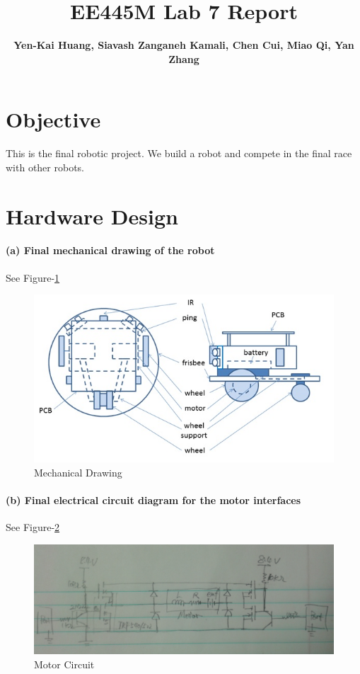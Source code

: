 \documentclass[a4paper]{article}
\newlength{\pic}
\begin{document}
\title{EE445M Lab 7 Report}
\author{\bfseries Yen-Kai Huang, Siavash Zanganeh Kamali, Chen Cui, Miao Qi, Yan Zhang}
\maketitle

\section{Objective} This is the final robotic project. We build a robot and compete in the final race with other robots.

\section{Hardware Design}

\paragraph{(a) Final mechanical drawing of the robot }
See Figure-\ref{mech}

\setlength{\pic}{\textwidth}
\begin{figure}[htp]
\center
\includegraphics[width=\pic]{circuits/mechanical_drawing}
\caption{Mechanical Drawing} \label{mech}
\end{figure}

\paragraph{(b) Final electrical circuit diagram for the motor interfaces }
See Figure-\ref{pwm}

\setlength{\pic}{10cm}
\begin{figure}[htp]
\center
\includegraphics[width=\pic]{circuits/Alternate_H-bridge}
\caption{Motor Circuit} \label{pwm}
\end{figure}
\end{document}
